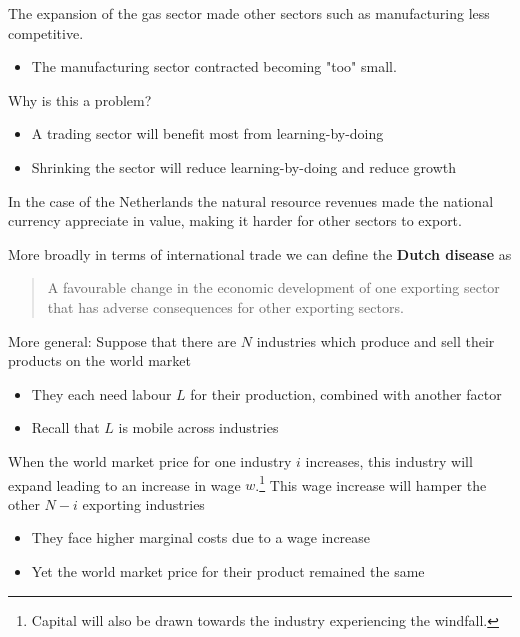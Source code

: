 \documentclass{beamer}
\begin{document}
\begin{frame}
 The expansion of the gas sector made other sectors such as manufacturing less competitive.
 \begin{itemize}
   \item The manufacturing sector contracted becoming "too" small.
 \end{itemize}
 \medskip
 Why is this a problem?
 \begin{itemize}
   \item A trading sector will benefit most from learning-by-doing
   \item Shrinking the sector will reduce learning-by-doing and reduce growth
 \end{itemize}
 \medskip
 In the case of the Netherlands the natural resource revenues made the national currency appreciate in value, making it harder for other sectors to export.
 \end{frame}

\begin{frame}
  More broadly in terms of international trade we can define the \textbf{Dutch disease} as
  \begin{quote}
  A favourable change in the economic development of one exporting sector that has adverse consequences for other exporting sectors.
  \end{quote}
\end{frame}

\begin{frame}
 More general: Suppose that there are $N$ industries which produce and sell their products on the world market
  \begin{itemize}
    \item They each need labour $L$ for their production, combined with another factor 
    \item Recall that $L$ is mobile across industries
  \end{itemize}
  \medskip
  When the world market price for one industry $i$ increases, this industry will expand leading to an increase in wage $w$.\footnote{Capital will also be drawn towards the industry experiencing the windfall.}
  This wage increase will hamper the other $N-i$ exporting industries
  \begin{itemize}
    \item They face higher marginal costs due to a wage increase
    \item Yet the world market price for their product remained the same 
  \end{itemize}
\end{frame}
\end{document}
